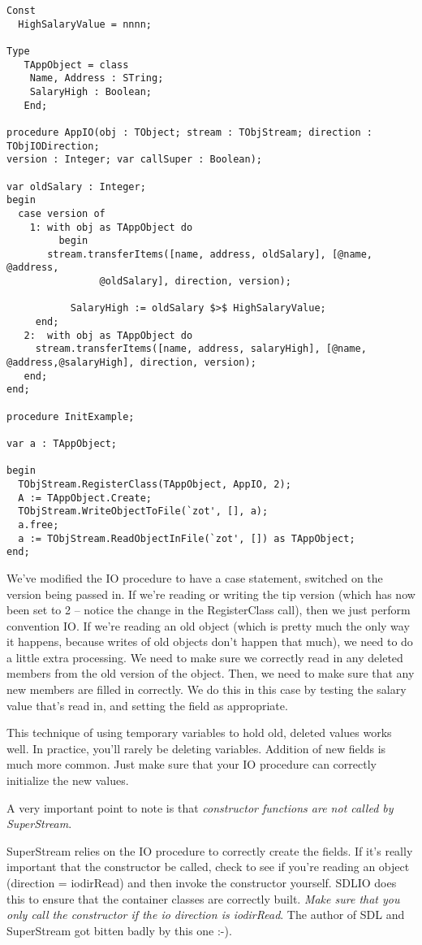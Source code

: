 \documentclass{report}
\begin{document}
\begin{lstlisting}
Const
  HighSalaryValue = nnnn;

Type
   TAppObject = class
	Name, Address : STring;
	SalaryHigh : Boolean;
   End;

procedure AppIO(obj : TObject; stream : TObjStream; direction : TObjIODirection;
version : Integer; var callSuper : Boolean);

var oldSalary : Integer;
begin
  case version of
    1: with obj as TAppObject do
         begin
	   stream.transferItems([name, address, oldSalary], [@name, @address,
				@oldSalary], direction, version);

           SalaryHigh := oldSalary $>$ HighSalaryValue;
	 end;
   2:  with obj as TAppObject do
 	 stream.transferItems([name, address, salaryHigh], [@name, @address,@salaryHigh], direction, version);
   end;       
end;

procedure InitExample;

var a : TAppObject;

begin
  TObjStream.RegisterClass(TAppObject, AppIO, 2); 
  A := TAppObject.Create;
  TObjStream.WriteObjectToFile(`zot', [], a);
  a.free;
  a := TObjStream.ReadObjectInFile(`zot', []) as TAppObject;
end;
\end{lstlisting}

We've modified the IO procedure to have a case statement, switched on the
version being passed in. If we're reading or writing the tip version (which
has now been set to 2 -- notice the change in the RegisterClass call), then
we just perform convention IO. If we're reading an old object (which is
pretty much the only way it happens, because writes of old objects don't
happen that much), we need to do a little extra processing.  We need to make
sure we correctly read in any deleted members from the old version of the
object. Then, we need to make sure that any new members are filled in
correctly. We do this in this case by testing the salary value that's read
in, and setting the field as appropriate.

This technique of using temporary variables to hold old, deleted values
works well. In practice, you'll rarely be deleting variables. Addition of
new fields is much more common. Just make sure that your IO procedure can
correctly initialize the new values.

A very important point to note is that \emph{constructor functions are not
called by SuperStream}.

SuperStream relies on the IO procedure to correctly create the fields. If
it's really important that the constructor be called, check to see if you're
reading an object (direction = iodirRead) and then invoke the constructor
yourself. SDLIO does this to ensure that the container classes are correctly
built. \emph{Make sure that you only call the constructor if the io
direction is iodirRead}. The author of SDL and SuperStream got bitten badly 
by this one :-).
\end{document}

